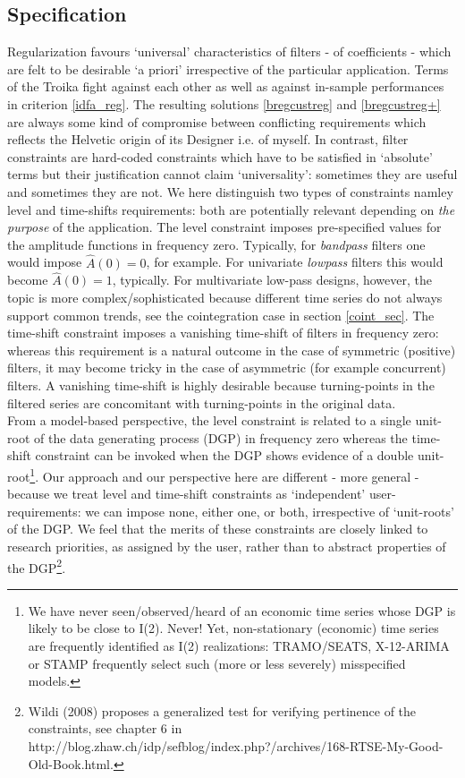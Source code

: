 \documentclass[11pt]{article}
\begin{document}
\subsection{Specification}

Regularization favours `universal' characteristics of filters - of coefficients -  which are felt to be desirable `a priori' irrespective of the particular application. 
Terms of the Troika fight against each other as well as against in-sample performances in criterion \ref{idfa_reg}. The resulting solutions \ref{bregcustreg} and \ref{bregcustreg+} are always some kind of  compromise between conflicting requirements which reflects the Helvetic origin of its Designer i.e. of myself. In contrast, filter constraints are hard-coded constraints which have to be satisfied in `absolute' terms but their justification cannot claim `universality': sometimes they are useful and sometimes they are not. We here distinguish two types of constraints namley level and time-shifts requirements: both are potentially relevant depending on \emph{the purpose} of the application. The level constraint imposes pre-specified values for the amplitude functions  in frequency zero. Typically, for \emph{bandpass} filters one would impose $\hat{A}(0)=0$, for example. For univariate \emph{lowpass} filters this would become $\hat{A}(0)=1$, typically. For multivariate low-pass designs, however, the topic is more complex/sophisticated because different time series do not always support common trends, see the cointegration case in section \ref{coint_sec}. The time-shift constraint imposes a vanishing time-shift of filters in frequency zero: whereas this requirement is a natural outcome in the case of  symmetric (positive) filters, it may become tricky in the case of asymmetric (for example concurrent) filters. A vanishing time-shift is highly desirable because turning-points in the filtered series are concomitant with turning-points in the original data. \\
From a model-based perspective, the level constraint is related to a single unit-root of the data generating process (DGP) in frequency zero whereas the time-shift constraint can be invoked when the DGP shows evidence of  a double unit-root\footnote{We have never seen/observed/heard of an economic time series whose DGP is likely to be close to I(2). Never! Yet, non-stationary (economic) time series are frequently identified as I(2) realizations: TRAMO/SEATS, X-12-ARIMA or STAMP frequently select such (more or less severely) misspecified models.}. Our approach and our perspective here are  different - more general - because we treat level and time-shift constraints as `independent' user-requirements: we can impose none, either one, or both, irrespective of `unit-roots' of the DGP. We feel that the merits of these constraints are closely linked to research priorities, as assigned by the user, rather than to abstract properties of the DGP\footnote{ Wildi (2008) proposes a generalized test for verifying pertinence of the constraints, see chapter 6 in  http://blog.zhaw.ch/idp/sefblog/index.php?/archives/168-RTSE-My-Good-Old-Book.html.}.\\
\end{document}
